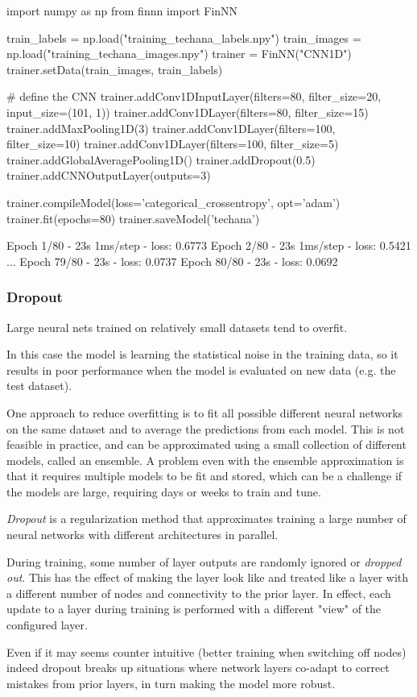 \begin{ipython}
import numpy as np
from finnn import FinNN

train_labels = np.load("training_techana_labels.npy")
train_images = np.load("training_techana_images.npy")
trainer = FinNN("CNN1D")
trainer.setData(train_images, train_labels)

# define the CNN
trainer.addConv1DInputLayer(filters=80, filter_size=20,
                            input_size=(101, 1))
trainer.addConv1DLayer(filters=80, filter_size=15)
trainer.addMaxPooling1D(3)
trainer.addConv1DLayer(filters=100, filter_size=10)
trainer.addConv1DLayer(filters=100, filter_size=5)
trainer.addGlobalAveragePooling1D()
trainer.addDropout(0.5)
trainer.addCNNOutputLayer(outputs=3)

trainer.compileModel(loss='categorical_crossentropy', opt='adam')
trainer.fit(epochs=80)
trainer.saveModel('techana')
\end{ipython}
\begin{ioutput}
Epoch 1/80
- 23s 1ms/step - loss: 0.6773
Epoch 2/80
- 23s 1ms/step - loss: 0.5421
...
Epoch 79/80
- 23s - loss: 0.0737
Epoch 80/80
- 23s - loss: 0.0692
\end{ioutput}

\begin{attention}
\subsubsection{Dropout}

Large neural nets trained on relatively small datasets tend to overfit.

In this case the model is learning the statistical noise in the training data, so it results in poor performance when the model is evaluated on new data (e.g. the test dataset).

One approach to reduce overfitting is to fit all possible different neural networks on the same dataset and to average the predictions from each model. This is not feasible in practice, and can be approximated using a small collection of different models, called an ensemble. A problem even with the ensemble approximation is that it requires multiple models to be fit and stored, which can be a challenge if the models are large, requiring days or weeks to train and tune.

\emph{Dropout} is a regularization method that approximates training a large number of neural networks with different architectures in parallel.

During training, some number of layer outputs are randomly ignored or \emph{dropped out}. This has the effect of making the layer look like and treated like a layer with a different number of nodes and connectivity to the prior layer. In effect, each update to a layer during training is performed with a different "view" of the configured layer.

Even if it may seems counter intuitive (better training when switching off nodes) indeed dropout breaks up situations where network layers co-adapt to correct mistakes from prior layers, in turn making the model more robust.
\end{attention}

